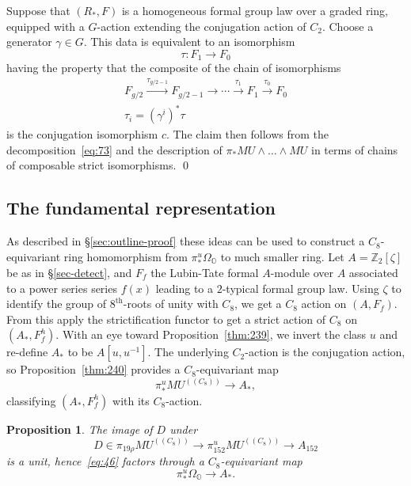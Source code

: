 \documentclass{amsart}
\newtheorem{prop}[equation]{Proposition}
\theoremstyle{definition}
\theoremstyle{remark}
\newenvironment{pf}{\bigskip{\em Proof:\/}}{\qed\medskip}
\newcommand{\Z}{{\mathbb Z}}
\newcommand{\mutn}[1]{MU^{(\!(#1)\!)}}
\newcommand{\piu}{\pi^{u}}
\newcommand{\zt}{C_{2}}
\newcommand{\ze}{C_{8}}
\newcommand{\premagic}{\Omega_{\mathbb{O}}}
\newcommand{\ltgroup}{F_{f}}
\begin{document}
\begin{pf}
Suppose that $(R_{\ast}, F)$ is a homogeneous formal group law over a
graded ring, equipped with a $G$-action extending the conjugation
action of $\zt$.   Choose a generator $\gamma\in G$.   This data is
equivalent to an isomorphism 
\[
\tau:F_{1}\to F_{0}
\]
having the property that the composite of the chain of isomorphisms 
\begin{gather*}
F_{g/2}\xrightarrow{\tau_{g/2-1}}{} F_{g/2-1}\xrightarrow{}{}\cdots
\xrightarrow{\tau_{1}}{}F_{1}\xrightarrow{\tau_{0}}{} F_{0} \\
\tau_{i} = (\gamma^{i})^{\ast}\tau
\end{gather*}
is the conjugation isomorphism $c$.  The claim then follows from the
decomposition~\eqref{eq:73} and the description of
$\pi_{\ast}MU\wedge\dots\wedge MU$ in terms of chains of composable
strict isomorphisms.
\end{pf}


\subsection{The fundamental representation}
\label{sec:fund-repr}

As described in \S\ref{sec:outline-proof} these ideas can be used to
construct a $\ze$-equivariant ring homomorphism from
$\piu_{\ast}\premagic$ to much smaller ring.  Let $A=\Z_{2}[\zeta]$ be
as in \S\ref{sec-detect}, and $\ltgroup$ the Lubin-Tate formal
$A$-module over $A$ associated to a power series series $f(x)$ leading
to a $2$-typical formal group law.  Using $\zeta$ to identify the
group of $8^{\text{th}}$-roots of unity with $\ze$, we get a $\ze$
action on $(A,\ltgroup)$.  From this apply the strictification functor
to get a strict action of $\ze$ on $(A_{\ast}, \ltgroup^{h})$.  With
an eye toward Proposition~\ref{thm:239}, we invert the class $u$ and
re-define $A_{\ast}$ to be $A[u,u^{-1}]$.  The underlying $\zt$-action
is the conjugation action, so Proposition~\ref{thm:240} provides a
$\ze$-equivariant map
\begin{equation}
\label{eq:46}
\piu_{\ast}\mutn{\ze}\to A_{\ast},
\end{equation}
classifying $(A_{\ast},\ltgroup^{h})$ with its $\ze$-action.

\begin{prop}
The image of $D$ under
\[
D\in\pi_{19\rho}\mutn{\ze} \to \piu_{152} \mutn{\ze} \to A_{152}
\]
is a unit, hence~\eqref{eq:46} factors through a $\ze$-equivariant map 
\[
\piu_{\ast}\premagic\to A_{\ast}.
\]
\end{prop}
\end{document}
